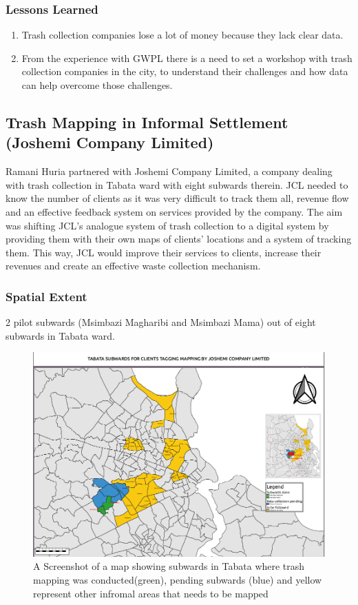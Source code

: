 \documentclass[a4paper,12pt,twoside]{article}
\begin{document}
\subsubsection{Lessons Learned}
\begin{enumerate}
    \item Trash collection companies lose a lot of money because they lack clear data.

    \item From the experience with GWPL there is a need to set a workshop with trash collection companies in the city, to understand their challenges and how data can help overcome those challenges.
\end{enumerate}



\newpage
\subsection{Trash Mapping in Informal Settlement (Joshemi Company Limited)}

Ramani Huria partnered with Joshemi Company Limited, a company  dealing with trash collection in Tabata ward with eight subwards therein. JCL needed to know the number of clients as it was very difficult to track them all, revenue flow and an effective feedback system on services provided by the company. The aim was shifting JCL’s analogue system of trash collection to a digital system by providing them with their own maps of clients’ locations and a system of tracking them. This way, JCL would improve their services to clients, increase their revenues and create an effective waste collection mechanism.

\subsubsection {Spatial Extent}
2 pilot subwards (Msimbazi Magharibi and Msimbazi Mama) out of eight subwards in Tabata ward.
\begin{figure}[h]
  \caption{A Screenshot of a map showing subwards in Tabata where trash mapping was conducted(green), pending subwards (blue) and yellow represent other infromal areas that needs to be mapped}
  \centering
  \includegraphics[width=1\textwidth]{images/JCL_Spatial_Extent.png}
\end{figure}
\newpage
\end{document}
